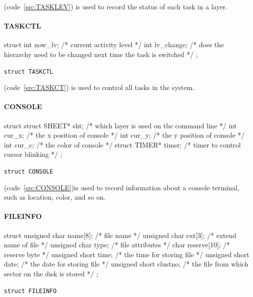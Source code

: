\documentclass{swfcthesis}
\begin{document}
(code~\ref{src:TASKLEV}) is used to record the status of each task in a layer.


\paragraph{TASKCTL}

\begin{listing}[H]
  \begin{codeblock}
\begin{ccode}
struct 
{ 
  int now_lv;    /* current activity level */
  int lv_change; /* does the hierarchy need to be changed next time the task is switched */
};
\end{ccode}
  \end{codeblock}
  \caption{\texttt{struct TASKCTL}}\label{src:TASKCT}
\end{listing}

(code~\ref{src:TASKCT}) is used to control all tasks in the system.



\paragraph{CONSOLE}

\begin{listing}[H]
  \begin{codeblock}
\begin{ccode}
struct 
{ 
  struct SHEET* sht;   /* which layer is used on the command line */
  int cur_x;           /* the x position of console */
  int cur_y;           /* the y position of console */
  int cur_c;           /* the color of console */
  struct TIMER* timer; /* timer to control cursor blinking */
};
\end{ccode}
  \end{codeblock}
  \caption{\texttt{struct CONSOLE}}\label{src:CONSOLE}
\end{listing}

(code~\ref{src:CONSOLE})is used to record information about a console terminal, such as location,
color, and so on.




\paragraph{FILEINFO}

\begin{listing}[H]
  \begin{codeblock}
\begin{ccode}
struct 
{ 
  unsigned char name[8];   /* file name */
  unsigned char ext[3];    /* extend name of file */
  unsigned char type;      /* file attributes */
  char reserve[10];        /* reserve byte */
  unsigned short time;     /* the time for storing file */
  unsigned short date;     /* the date for storing file */
  unsigned short  clustno; /* the file from which sector on the disk is stored */
};
\end{ccode}
  \end{codeblock}
  \caption{\texttt{struct FILEINFO}}\label{src:FILEINFO}
\end{listing}
\end{document}
